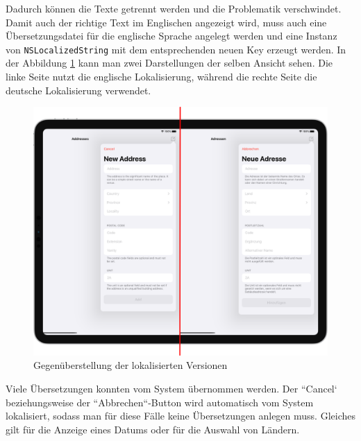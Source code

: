 Dadurch können die Texte getrennt werden und die Problematik verschwindet.
Damit auch der richtige Text im Englischen angezeigt wird, muss auch eine Übersetzungsdatei für die englische Sprache angelegt werden und eine Instanz von \texttt{NSLocalizedString} mit dem entsprechenden neuen Key erzeugt werden.\pbreak%
%
In der Abbildung \ref{fig:localized-results} kann man zwei Darstellungen der selben Ansicht sehen.
Die linke Seite nutzt die englische Lokalisierung, während die rechte Seite die deutsche Lokalisierung verwendet.
\begin{figure}[h]
	\centering
	\includegraphics[scale=0.25]{images/localized.png}
	\caption{Gegenüberstellung der lokalisierten Versionen}
	\label{fig:localized-results}
\end{figure}
Viele Übersetzungen konnten vom System übernommen werden.
Der ``Cancel` beziehungsweise der ``Abbrechen``-Button wird automatisch vom System lokalisiert, sodass man für diese Fälle keine Übersetzungen anlegen muss.
Gleiches gilt für die Anzeige eines Datums oder für die Auswahl von Ländern.

